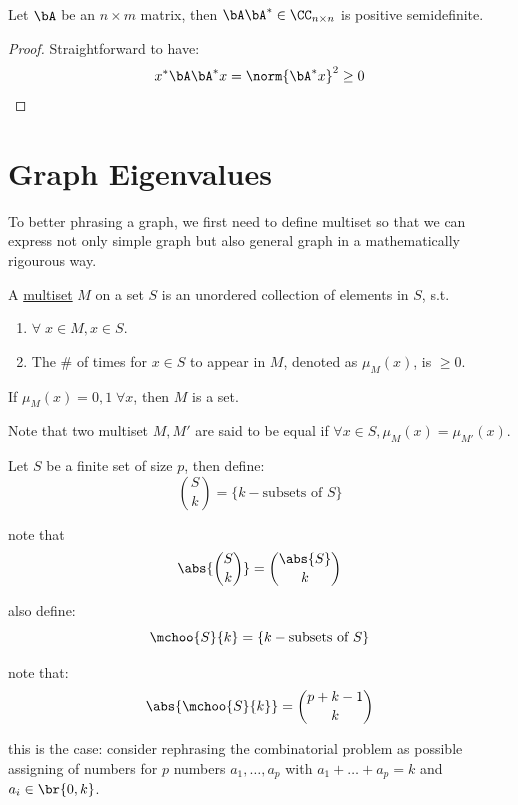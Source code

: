 \begin{lemma}
	Let \( \bA \) be an \( n\times m \) matrix, then \( \bA \bA^* \in \CC_{n\times n} \) is positive
	semidefinite.
\end{lemma}

\begin{proof}
	Straightforward to have:
	\[
		x^* \bA \bA^* x = \norm{\bA^* x}^2 \geq 0
	\]
\end{proof}


\section{Graph Eigenvalues}

To better phrasing a graph, we first need to define multiset so that we can express not only simple graph but also general graph in a mathematically rigourous way.

\begin{definition}
	A \underline{multiset} \( M \) on a set \( S \) is an unordered collection of elements in \( S \), s.t.
	\begin{enumerate}
		\item \( \forall \; x \in M, x \in S \).
		\item The \( \# \) of times for \( x\in S \) to appear in \( M \), denoted as \( \mu_M(x) \), is \( \geq 0 \).
	\end{enumerate}
\end{definition}

\begin{eg}
	If \( \mu_M(x) = 0, 1 \; \forall x\), then \( M \) is a set.
\end{eg}

Note that two multiset \( M, M' \) are said to be equal if \( \forall x \in S, \mu_{M} (x) = \mu_{M'}(x)\).

\begin{notation}
	Let \( S \) be a finite set of size \( p \), then define:
	\[
		\binom{S}{k} = \{k-\text{subsets of } S\}
	\]

	note that
	\[
		\abs{\binom{S}{k}} = \binom{\abs{S}}{k}
	\]

	also define:
	\[
		\mchoo{S}{k} = \{k-\text{subsets of } S\}
	\]

	note that:
	\[
		\abs{\mchoo{S}{k}} = \binom{p+k-1}{k}
	\]

	this is the case: consider rephrasing the combinatorial problem as possible assigning of numbers for \( p \) numbers \( a_1, \ldots, a_p \) with \( a_1 + \ldots + a_p = k \) and \( a_i \in \br{0,k} \).
\end{notation}

